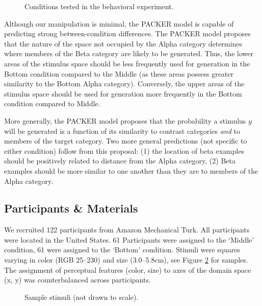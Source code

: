\documentclass[10pt,letterpaper]{article}
\begin{document}
\begin{figure}
    \begin{center}
    
    \caption{Conditions tested in the behavioral experiment.}
    \label{fig:middle-bottom-conditions}
    \end{center}
\end{figure}

Although our manipulation is minimal, the PACKER model is capable of predicting strong between-condition differences. The PACKER model proposes that the nature of the space not occupied by the Alpha category determines where members of the Beta category are likely to be generated. Thus, the lower areas of the stimulus space should be less frequently used for generation in the Bottom condition compared to the Middle (as these areas possess greater similarity to the Bottom Alpha category). Conversely, the upper areas of the stimulus space should be used for generation more frequently in the Bottom condition compared to Middle.

More generally, the PACKER model proposes that the probability a stimulus $y$ will be generated is a function of its similarity to contrast categories \textit{and} to members of the target category. Two more general predictions (not specific to either condition) follow from this proposal: (1) the location of beta examples should be positively related to distance from the Alpha category, (2) Beta examples should be more similar to one another than they are to members of the Alpha category.



\subsection{Participants \& Materials}

We recruited 122 participants from Amazon Mechanical Turk. All participants were located in the United States. 61 Participants were assigned to the `Middle' condition, 61 were assigned to the `Bottom' condition. Stimuli were squares varying in color (RGB 25--230) and size (3.0--5.8cm), see Figure \ref{fig:stimuli-samples} for samples. The assignment of perceptual features (color, size) to axes of the domain space (x, y) was counterbalanced across participants.

\begin{figure}
    \begin{center}
    
    \caption{Sample stimuli (not drawn to scale).}
    \label{fig:stimuli-samples}
    \end{center}
\end{figure}
\end{document}
